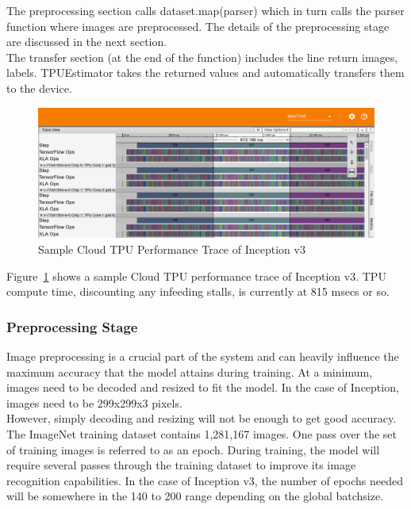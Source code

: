 \documentclass[14pt]{report}
\begin{document}
				The preprocessing section calls dataset.map(parser) which in turn calls the parser function where images are preprocessed. The details of the preprocessing stage are discussed in the next section.\\

				The transfer section (at the end of the function) includes the line return images, labels. TPUEstimator takes the returned values and automatically transfers them to the device.\\
				\begin{figure}[h]
					\includegraphics[width=\textwidth]{TPUInception.png}
					\centering
					\caption{Sample Cloud TPU Performance Trace of Inception v3}
					\label{fig:TPUInception}
				\end{figure}

				Figure~\ref{fig:TPUInception} shows a sample Cloud TPU performance trace of Inception v3. TPU compute time, discounting any infeeding stalls, is currently at 815 msecs or so.\\
			\subsubsection{Preprocessing Stage}
				Image preprocessing is a crucial part of the system and can heavily influence the maximum accuracy that the model attains during training. At a minimum, images need to be decoded and resized to fit the model. In the case of Inception, images need to be 299x299x3 pixels.\\

				However, simply decoding and resizing will not be enough to get good accuracy. The ImageNet training dataset contains 1,281,167 images. One pass over the set of training images is referred to as an epoch. During training, the model will require several passes through the training dataset to improve its image recognition capabilities. In the case of Inception v3, the number of epochs needed will be somewhere in the 140 to 200 range depending on the global batchsize.\\
\end{document}
